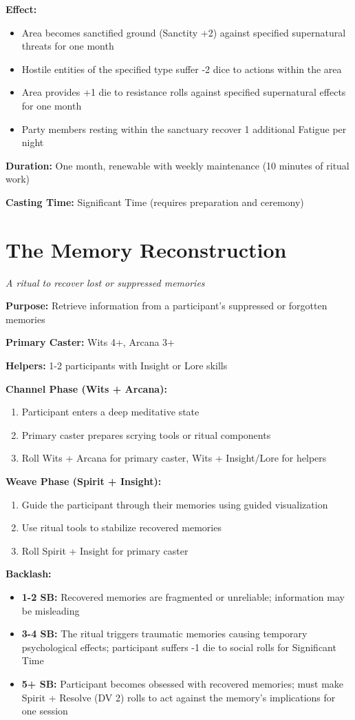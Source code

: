 \textbf{Effect:}
\begin{itemize}
\item Area becomes sanctified ground (Sanctity +2) against specified supernatural threats for one month
\item Hostile entities of the specified type suffer -2 dice to actions within the area
\item Area provides +1 die to resistance rolls against specified supernatural effects for one month
\item Party members resting within the sanctuary recover 1 additional Fatigue per night
\end{itemize}

\textbf{Duration:} One month, renewable with weekly maintenance (10 minutes of ritual work)

\textbf{Casting Time:} Significant Time (requires preparation and ceremony)

\section*{The Memory Reconstruction}
\textit{A ritual to recover lost or suppressed memories}

\textbf{Purpose:} Retrieve information from a participant's suppressed or forgotten memories

\textbf{Primary Caster:} Wits 4+, Arcana 3+

\textbf{Helpers:} 1-2 participants with Insight or Lore skills

\textbf{Channel Phase (Wits + Arcana):}
\begin{enumerate}
\item Participant enters a deep meditative state
\item Primary caster prepares scrying tools or ritual components
\item Roll Wits + Arcana for primary caster, Wits + Insight/Lore for helpers
\end{enumerate}

\textbf{Weave Phase (Spirit + Insight):}
\begin{enumerate}
\item Guide the participant through their memories using guided visualization
\item Use ritual tools to stabilize recovered memories
\item Roll Spirit + Insight for primary caster
\end{enumerate}

\textbf{Backlash:}
\begin{itemize}
\item \textbf{1-2 SB:} Recovered memories are fragmented or unreliable; information may be misleading
\item \textbf{3-4 SB:} The ritual triggers traumatic memories causing temporary psychological effects; participant suffers -1 die to social rolls for Significant Time
\item \textbf{5+ SB:} Participant becomes obsessed with recovered memories; must make Spirit + Resolve (DV 2) rolls to act against the memory's implications for one session
\end{itemize}

